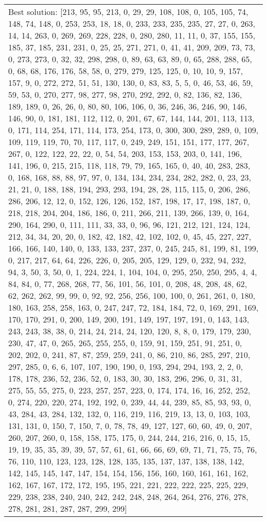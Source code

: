 \documentclass[]{article}
\begin{document}
\begin{table}[!ht]
\begin{tabular}{|m{3.2cm}|>{\centering\arraybackslash}m{2.8cm}|>{\centering\arraybackslash}m{2.8cm}|>{\centering\arraybackslash}m{2.8cm}|>{\centering\arraybackslash}m{2.8cm}|}
		\multicolumn{5}{|m{14cm}|}{Best solution: [213, 95, 95, 213, 0, 29, 29, 108, 108, 0, 105, 105, 74, 148, 74, 148, 0, 253, 253, 18, 18, 0, 233, 233, 235, 235, 27, 27, 0, 263, 14, 14, 263, 0, 269, 269, 228, 228, 0, 280, 280, 11, 11, 0, 37, 155, 155, 185, 37, 185, 231, 231, 0, 25, 25, 271, 271, 0, 41, 41, 209, 209, 73, 73, 0, 273, 273, 0, 32, 32, 298, 298, 0, 89, 63, 63, 89, 0, 65, 288, 288, 65, 0, 68, 68, 176, 176, 58, 58, 0, 279, 279, 125, 125, 0, 10, 10, 9, 157, 157, 9, 0, 272, 272, 51, 51, 130, 130, 0, 83, 83, 5, 5, 0, 46, 53, 46, 59, 59, 53, 0, 270, 277, 98, 277, 98, 270, 292, 292, 0, 82, 136, 82, 136, 189, 189, 0, 26, 26, 0, 80, 80, 106, 106, 0, 36, 246, 36, 246, 90, 146, 146, 90, 0, 181, 181, 112, 112, 0, 201, 67, 67, 144, 144, 201, 113, 113, 0, 171, 114, 254, 171, 114, 173, 254, 173, 0, 300, 300, 289, 289, 0, 109, 109, 119, 119, 70, 70, 117, 117, 0, 249, 249, 151, 151, 177, 177, 267, 267, 0, 122, 122, 22, 22, 0, 54, 54, 203, 153, 153, 203, 0, 141, 196, 141, 196, 0, 215, 215, 118, 118, 79, 79, 165, 165, 0, 40, 40, 283, 283, 0, 168, 168, 88, 88, 97, 97, 0, 134, 134, 234, 234, 282, 282, 0, 23, 23, 21, 21, 0, 188, 188, 194, 293, 293, 194, 28, 28, 115, 115, 0, 206, 286, 286, 206, 12, 12, 0, 152, 126, 126, 152, 187, 198, 17, 17, 198, 187, 0, 218, 218, 204, 204, 186, 186, 0, 211, 266, 211, 139, 266, 139, 0, 164, 290, 164, 290, 0, 111, 111, 33, 33, 0, 96, 96, 121, 212, 121, 124, 124, 212, 34, 34, 20, 20, 0, 182, 42, 182, 42, 102, 102, 0, 45, 45, 227, 227, 166, 166, 140, 140, 0, 133, 133, 237, 237, 0, 245, 245, 81, 199, 81, 199, 0, 217, 217, 64, 64, 226, 226, 0, 205, 205, 129, 129, 0, 232, 94, 232, 94, 3, 50, 3, 50, 0, 1, 224, 224, 1, 104, 104, 0, 295, 250, 250, 295, 4, 4, 84, 84, 0, 77, 268, 268, 77, 56, 101, 56, 101, 0, 208, 48, 208, 48, 62, 62, 262, 262, 99, 99, 0, 92, 92, 256, 256, 100, 100, 0, 261, 261, 0, 180, 180, 163, 258, 258, 163, 0, 247, 247, 72, 184, 184, 72, 0, 169, 291, 169, 170, 170, 291, 0, 200, 149, 200, 191, 149, 197, 197, 191, 0, 143, 143, 243, 243, 38, 38, 0, 214, 24, 214, 24, 120, 120, 8, 8, 0, 179, 179, 230, 230, 47, 47, 0, 265, 265, 255, 255, 0, 159, 91, 159, 251, 91, 251, 0, 202, 202, 0, 241, 87, 87, 259, 259, 241, 0, 86, 210, 86, 285, 297, 210, 297, 285, 0, 6, 6, 107, 107, 190, 190, 0, 193, 294, 294, 193, 2, 2, 0, 178, 178, 236, 52, 236, 52, 0, 183, 30, 30, 183, 296, 296, 0, 31, 31, 275, 55, 55, 275, 0, 223, 257, 257, 223, 0, 174, 174, 16, 16, 252, 252, 0, 274, 220, 220, 274, 192, 192, 0, 239, 44, 44, 239, 85, 85, 93, 93, 0, 43, 284, 43, 284, 132, 132, 0, 116, 219, 116, 219, 13, 13, 0, 103, 103, 131, 131, 0, 150, 7, 150, 7, 0, 78, 78, 49, 127, 127, 60, 60, 49, 0, 207, 260, 207, 260, 0, 158, 158, 175, 175, 0, 244, 244, 216, 216, 0, 15, 15, 19, 19, 35, 35, 39, 39, 57, 57, 61, 61, 66, 66, 69, 69, 71, 71, 75, 75, 76, 76, 110, 110, 123, 123, 128, 128, 135, 135, 137, 137, 138, 138, 142, 142, 145, 145, 147, 147, 154, 154, 156, 156, 160, 160, 161, 161, 162, 162, 167, 167, 172, 172, 195, 195, 221, 221, 222, 222, 225, 225, 229, 229, 238, 238, 240, 240, 242, 242, 248, 248, 264, 264, 276, 276, 278, 278, 281, 281, 287, 287, 299, 299]}\\

\end{tabular}
\end{table}
\end{document}
